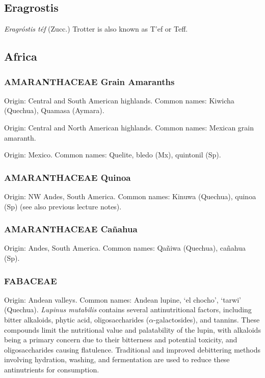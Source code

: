 \subsection{Eragrostis} 
\textit{Eragróstis téf} (Zucc.) Trotter is also known as T'ef or Teff.

\subsection{Africa} 
\subsubsection{AMARANTHACEAE Grain Amaranths} 

Origin: Central and South American highlands. Common names: Kiwicha (Quechua), Quamasa (Aymara).

Origin: Central and North American highlands. Common names: Mexican grain amaranth.

Origin: Mexico. Common names: Quelite, bledo (Mx), quintonil (Sp).

\subsubsection{AMARANTHACEAE Quinoa} 
Origin: NW Andes, South America. Common names: Kinuwa (Quechua), quinoa (Sp) (see also previous lecture notes).

\subsubsection{AMARANTHACEAE Cañahua} 
Origin: Andes, South America. Common names: Qañiwa (Quechua), cañahua (Sp).

\subsubsection{FABACEAE} 
Origin: Andean valleys. Common names: Andean lupine, ‘el chocho’, ‘tarwi’ (Quechua). \textit{Lupinus mutabilis} contains several antinutritional factors, including bitter alkaloids, phytic acid, oligosaccharides ($\alpha$-galactosides), and tannins. These compounds limit the nutritional value and palatability of the lupin, with alkaloids being a primary concern due to their bitterness and potential toxicity, and oligosaccharides causing flatulence. Traditional and improved debittering methods involving hydration, washing, and fermentation are used to reduce these antinutrients for consumption.

